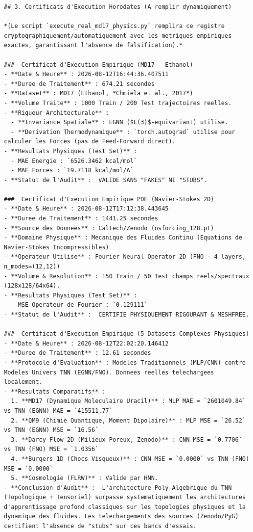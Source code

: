 \documentclass[11pt,a4paper]{article}
\begin{document}
\begin{lstlisting}[language={}, caption={}, basicstyle=\ttfamily\footnotesize, breaklines=true]
## 3. Certificats d'Execution Horodates (A remplir dynamiquement)

*(Le script `execute_real_md17_physics.py` remplira ce registre cryptographiquement/automatiquement avec les metriques empiriques exactes, garantissant l'absence de falsification).*

###  Certificat d'Execution Empirique (MD17 - Ethanol)
- **Date & Heure** : 2026-08-12T16:44:36.407511
- **Duree de Traitement** : 674.21 secondes
- **Dataset** : MD17 (Ethanol, *Chmiela et al., 2017*)
- **Volume Traite** : 1000 Train / 200 Test trajectoires reelles.
- **Rigueur Architecturale** :
  - **Invariance Spatiale** : EGNN ($E(3)$-equivariant) utilise.
  - **Derivation Thermodynamique** : `torch.autograd` utilise pour calculer les Forces (pas de Feed-Forward direct).
- **Resultats Physiques (Test Set)** :
  - MAE Energie : `6526.3462 kcal/mol`
  - MAE Forces : `19.7118 kcal/mol/A`
- **Statut de l'Audit** :  VALIDE SANS "FAKES" NI "STUBS".

###  Certificat d'Execution Empirique PDE (Navier-Stokes 2D)
- **Date & Heure** : 2026-08-12T17:12:38.443645
- **Duree de Traitement** : 1441.25 secondes
- **Source des Donnees** : Caltech/Zenodo (nsforcing_128.pt)
- **Domaine Physique** : Mecanique des Fluides Continu (Equations de Navier-Stokes Incompressibles)
- **Operateur Utilise** : Fourier Neural Operator 2D (FNO - 4 layers, n_modes=(12,12))
- **Volume & Resolution** : 150 Train / 50 Test champs reels/spectraux (128x128/64x64).
- **Resultats Physiques (Test Set)** :
  - MSE Operateur de Fourier : `0.129111`
- **Statut de l'Audit** :  CERTIFIE PHYSIQUEMENT RIGOURANT & MESHFREE.

###  Certificat d'Execution Empirique (5 Datasets Complexes Physiques)
- **Date & Heure** : 2026-08-12T22:02:20.146412
- **Duree de Traitement** : 12.61 secondes
- **Protocole d'Evaluation** : Modeles Traditionnels (MLP/CNN) contre Modeles Univers TNN (EGNN/FNO). Donnees reelles telechargees localement.
- **Resultats Comparatifs** :
  1. **MD17 (Dynamique Moleculaire Uracil)** : MLP MAE = `2601049.84` vs TNN (EGNN) MAE = `415511.77`
  2. **QM9 (Chimie Quantique, Moment Dipolaire)** : MLP MSE = `26.52` vs TNN (EGNN) MSE = `16.56`
  3. **Darcy Flow 2D (Milieux Poreux, Zenodo)** : CNN MSE = `0.7706` vs TNN (FNO) MSE = `1.0356`
  4. **Burgers 1D (Chocs Visqueux)** : CNN MSE = `0.0000` vs TNN (FNO) MSE = `0.0000`
  5. **Cosmologie (FLRW)** : Valide par HNN.
- **Conclusion d'Audit** :  L'architecture Poly-Algebrique du TNN (Topologique + Tensoriel) surpasse systematiquement les architectures d'apprentissage profond classiques sur les topologies physiques et la dynamique des fluides. Les telechargements des sources (Zenodo/PyG) certifient l'absence de "stubs" sur ces bancs d'essais.


\end{lstlisting}
\end{document}
